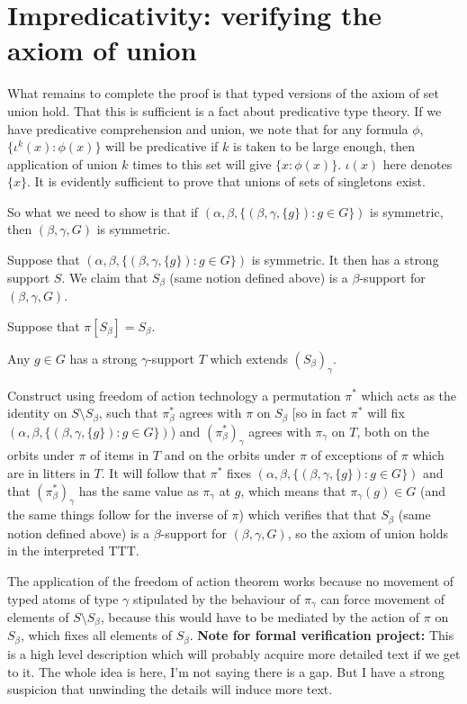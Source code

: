 \newpage
\section{Impredicativity:  verifying the axiom of union}

What remains to complete the proof is that typed versions of the axiom of set union hold.  That this is sufficient is a fact about predicative type theory.
If we have predicative comprehension and union, we note that for any formula $\phi$, $\{\iota^k(x):\phi(x)\}$ will be predicative if $k$ is taken to be large enough, then application of union $k$ times to this set will give $\{x:\phi(x)\}$.  $\iota(x)$ here denotes $\{x\}$.  It is evidently sufficient to prove that unions of sets of singletons exist.

So what we need to show is that if $(\alpha,\beta,\{(\beta,\gamma,\{g\}):g \in G\})$ is symmetric, then $(\beta,\gamma,G)$ is symmetric.

Suppose that $(\alpha,\beta,\{(\beta,\gamma,\{g\}):g \in G\})$ is symmetric.  It then has a strong support $S$.  We claim that $S_\beta$ (same notion defined above) is a $\beta$-support for $(\beta,\gamma,G)$.

Suppose that $\pi[S_\beta]=S_\beta$.

Any $g \in G$ has a strong $\gamma$-support $T$ which extends $(S_\beta)_\gamma$.

Construct using freedom of action technology a permutation $\pi^*$ which acts as the identity on $S \setminus S_\beta$, such that $\pi^*_\beta$ agrees with $\pi$ on $S_\beta$ [so in fact $\pi^*$ will fix $(\alpha,\beta,\{(\beta,\gamma,\{g\}):g \in G\})$) and $(\pi^*_\beta)_\gamma$ agrees with $\pi_\gamma$ on $T$, both on the orbits under $\pi$ of items in $T$ and on the orbits under $\pi$ of exceptions of $\pi$ which are in litters in $T$.  It will follow that $\pi^*$ fixes $(\alpha,\beta,\{(\beta,\gamma,\{g\}):g \in G\})$ and that $(\pi^*_\beta)_\gamma$ has the same value as $\pi_\gamma$ at $g$, which means that $\pi_\gamma(g) \in G$ (and the same things follow for the inverse of $\pi$) which verifies that that $S_\beta$ (same notion defined above) is a $\beta$-support for $(\beta,\gamma,G)$, so the axiom of union holds in the interpreted TTT.

The application of the freedom of action theorem works because no movement of typed atoms of type $\gamma$ stipulated by the behaviour of $\pi_\gamma$ can force
movement of elements of $S \setminus S_\beta$, because this would have to be mediated by the action of $\pi$ on $S_\beta$, which fixes all elements of $S_\beta$.
{\bf Note for formal verification project:}  This is a high level description which will probably acquire more detailed text if we get to it.  The whole idea is here, I'm not saying there is a gap.  But I have a strong suspicion that unwinding the details will induce more text.
